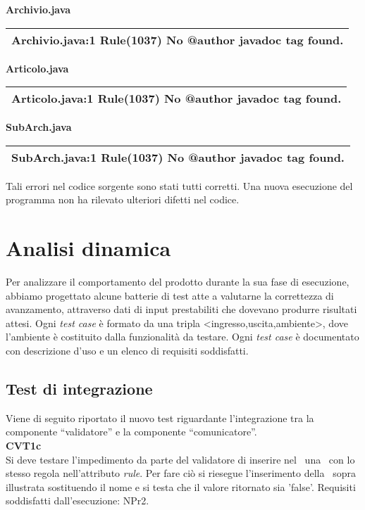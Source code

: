 \textbf{Archivio.java}
\begin{center}
\begin{tabular}{|p{12cm}|} \hline
Archivio.java:1 Rule(1037) No @author javadoc tag found.\\ \hline
\end{tabular}
\end{center}

\textbf{Articolo.java}
\begin{center}
\begin{tabular}{|p{12cm}|} \hline
Articolo.java:1 Rule(1037) No @author javadoc tag found.\\ \hline
\end{tabular}
\end{center}

\textbf{SubArch.java}
\begin{center}
\begin{tabular}{|p{12cm}|} \hline
SubArch.java:1 Rule(1037) No @author javadoc tag found.\\ \hline
\end{tabular}
\end{center}

Tali errori nel codice sorgente sono stati tutti corretti. Una nuova esecuzione del programma non ha rilevato ulteriori difetti nel codice.

\chapter{Analisi dinamica}
Per analizzare il comportamento del prodotto durante la sua fase di esecuzione, abbiamo progettato alcune batterie di test atte a valutarne la correttezza di avanzamento, attraverso dati di input prestabiliti che dovevano produrre risultati attesi.
Ogni \textit{test case} \`e formato da una tripla <ingresso,uscita,ambiente>, dove l'ambiente \`e costituito dalla funzionalit\`a da testare.
Ogni \textit{test case} \`e documentato con descrizione d'uso e un elenco di requisiti soddisfatti. 
\section{Test di integrazione}
Viene di seguito riportato il nuovo test riguardante l'integrazione tra la componente ``validatore'' e la componente ``comunicatore''. \\

\textbf{CVT1c} \\
Si deve testare l'impedimento da parte del validatore di inserire nel \rp\ una \br\ con lo stesso regola nell'attributo \textit{rule}. Per fare ci\`o si riesegue l'inserimento della \br\ sopra illustrata sostituendo il nome e si testa che il valore ritornato sia 'false'.
Requisiti soddisfatti dall'esecuzione: NPr2.\\
 \\


